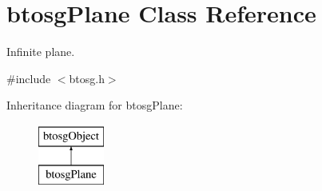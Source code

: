 \hypertarget{classbtosgPlane}{}\section{btosg\+Plane Class Reference}
\label{classbtosgPlane}


Infinite plane.  




{\ttfamily \#include $<$btosg.\+h$>$}

Inheritance diagram for btosg\+Plane\+:\begin{figure}[H]
\begin{center}
\leavevmode
\includegraphics[height=2.000000cm]{classbtosgPlane}
\end{center}
\end{figure}
